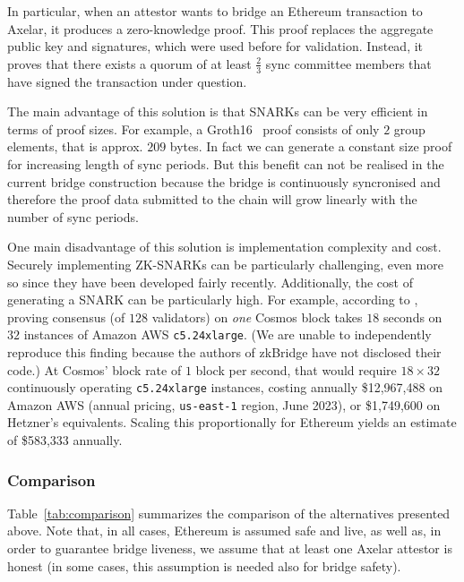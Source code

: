 In particular, when an attestor wants to bridge an Ethereum transaction to
Axelar, it produces a zero-knowledge proof. This proof replaces the aggregate
public key and signatures, which were used before for validation. Instead, it
proves that there exists a quorum of at least $\frac{2}{3}$ sync committee
members that have signed the transaction under question.

The main advantage of this solution is that SNARKs can be very efficient in
terms of proof sizes. For example, a Groth16~\cite{EC:Groth16} proof consists
of only $2$ group elements, that is approx. $209$ bytes. In fact we can generate a constant 
size proof for increasing length of sync periods. But this benefit 
can not be realised in the current bridge construction because the bridge is 
continuously syncronised and therefore the proof data submitted to the chain
will grow linearly with the number of sync periods.

One main disadvantage of this solution is implementation complexity and cost.
Securely implementing ZK-SNARKs can be particularly challenging, even more so
since they have been developed fairly recently. Additionally, the cost of
generating a SNARK can be particularly high. For example,
according to \cite{zkbridge}, proving consensus (of $128$ validators)
on \emph{one} Cosmos block
takes $18$ seconds on $32$ instances of Amazon AWS \texttt{c5.24xlarge}.
(We are unable to independently reproduce this finding because the authors of
zkBridge have not disclosed their code.)
At Cosmos' block rate of $1$ block per second,
that would require
$18 \times 32$ continuously operating \texttt{c5.24xlarge} instances,
costing annually
\$12,967,488 on Amazon AWS (annual pricing, \texttt{us-east-1} region, June 2023),
or \$1,749,600 on Hetzner's equivalents.
Scaling this proportionally for Ethereum
yields an estimate of \$583,333 annually.

\subsubsection{Comparison}

Table~\ref{tab:comparison} summarizes the comparison of the alternatives
presented above. Note that, in all cases, Ethereum is assumed safe and live, as
well as, in order to guarantee bridge liveness, we assume that at least one
Axelar attestor is honest (in some cases, this assumption is needed also for
bridge safety).

